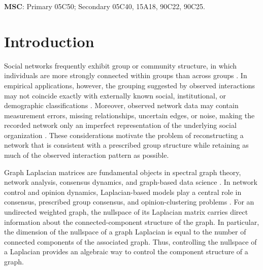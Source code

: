 \documentclass[11pt]{article}
\begin{document}
\vspace{0.5cm}
\textbf{MSC}: Primary 05C50; Secondary 05C40, 15A18, 90C22, 90C25.

\newpage
	
	
	
	\section{Introduction}
	
Social networks frequently exhibit group or community structure, in which 
individuals are more strongly connected within groups than across groups 
\cite{ArefEtAl2020, GirvanNewman2002}. In empirical applications, however, the grouping 
suggested by observed interactions may not coincide exactly with externally 
known social, institutional, or demographic classifications 
\cite{TraudKelsicMuchaPorter2011}. Moreover, observed network data may contain 
measurement errors, missing relationships, uncertain edges, or noise, making 
the recorded network only an imperfect representation of the underlying social 
organization \cite{MartinBallNewman2016,Newman2018}. These considerations 
motivate the problem of reconstructing a network that is consistent with a 
prescribed group structure while retaining as much of the observed interaction 
pattern as possible.

    
Graph Laplacian matrices are fundamental objects in spectral graph theory, network analysis, consensus dynamics, and graph-based data science \cite{Olfati-Saber}. In network control and opinion dynamics, Laplacian-based models play a central role in consensus, prescribed
group consensus, and opinion-clustering problems \cite{Spielman2010, TT}. For an undirected weighted graph, the nullspace of its Laplacian matrix carries direct information about the connected-component structure of the graph. In particular, the dimension of the nullspace of a graph Laplacian is equal to the number of connected components of the associated graph. Thus, controlling the nullspace of a Laplacian provides an algebraic way to control the component structure of a graph.
\end{document}
